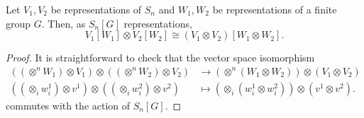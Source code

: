 \documentclass[ALCO, Unicode]{cedram}
\begin{document}
\begin{lemma} \label{lem:mult-wreath-prod-reps}
    Let $V_1, V_2$ be representations of $S_n$ and $W_1, W_2$ be representations of a finite group $G. $ Then, as $S_n[G]$ representations,\[V_1[W_1] \otimes V_2[W_2] \cong (V_1 \otimes V_2)[W_1 \otimes W_2].\] 
\end{lemma}
\begin{proof}
  It is straightforward to check that the vector space isomorphism 
    \begin{align*}
      \left((\otimes^n W_1)\otimes V_1 \right)\otimes \left((\otimes^n W_2)\otimes V_2 \right)&\longrightarrow (\otimes^n (W_1 \otimes W_2))\otimes (V_1 \otimes V_2)\\
        ((\otimes_{i}w^1_i)\otimes v^1)\otimes ((\otimes_{i} w^2_i) \otimes v^2) &\mapsto (\otimes_{i}(w_i^1 \otimes w_i^2)) \otimes (v^1 \otimes v^2).
    \end{align*}
commutes with the action of $S_n[G].$
\end{proof}
\end{document}
